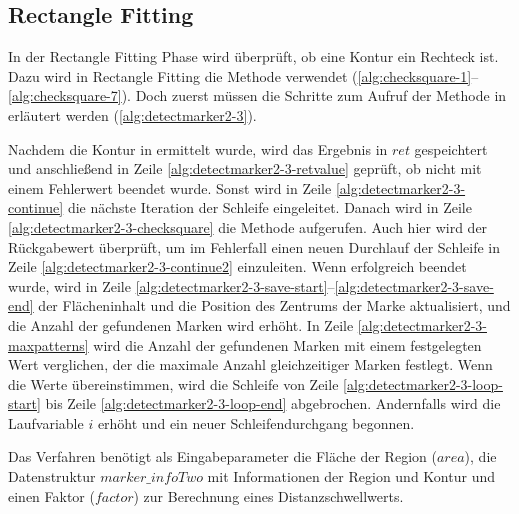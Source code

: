 \clearpage



\clearpage



\clearpage


\clearpage

\subsection{Rectangle Fitting} %
\label{sec:rectangle_fitting}

In der Rectangle Fitting Phase wird überprüft, ob eine Kontur ein Rechteck ist. Dazu wird in Rectangle Fitting die
 Methode  verwendet (\autoref{alg:checksquare-1}--\autoref{alg:checksquare-7}). Doch zuerst
 müssen die Schritte zum Aufruf der Methode in  erläutert werden
 (\autoref{alg:detectmarker2-3}).



Nachdem die Kontur in  ermittelt wurde, wird das Ergebnis in $\mathit{ret}$ gespeichtert und
 anschließend in Zeile \ref{alg:detectmarker2-3-retvalue} geprüft, ob  nicht mit einem
 Fehlerwert beendet wurde. Sonst wird in Zeile \ref{alg:detectmarker2-3-continue} die nächste Iteration der Schleife
 eingeleitet. Danach wird in Zeile \ref{alg:detectmarker2-3-checksquare} die Methode  aufgerufen.
 Auch hier wird der Rückgabewert überprüft, um im Fehlerfall einen neuen Durchlauf der Schleife in Zeile
 \ref{alg:detectmarker2-3-continue2} einzuleiten. Wenn  erfolgreich beendet wurde, wird in Zeile
 \ref{alg:detectmarker2-3-save-start}--\ref{alg:detectmarker2-3-save-end} der Flächeninhalt und die Position des
 Zentrums der Marke aktualisiert, und die Anzahl der gefundenen Marken wird erhöht. In Zeile
 \ref{alg:detectmarker2-3-maxpatterns} wird die Anzahl der gefundenen Marken mit einem festgelegten Wert verglichen, der
 die maximale Anzahl gleichzeitiger Marken festlegt. Wenn die Werte übereinstimmen, wird die Schleife von Zeile
 \ref{alg:detectmarker2-3-loop-start} bis Zeile \ref{alg:detectmarker2-3-loop-end} abgebrochen. Andernfalls wird die
 Laufvariable $i$ erhöht und ein neuer Schleifendurchgang begonnen.

Das Verfahren  benötigt als Eingabeparameter die Fläche der Region ($\mathit{area}$), die
 Datenstruktur $\mathit{marker\_infoTwo}$ mit Informationen der Region und Kontur und einen Faktor ($\mathit{factor}$)
 zur Berechnung eines Distanzschwellwerts.


